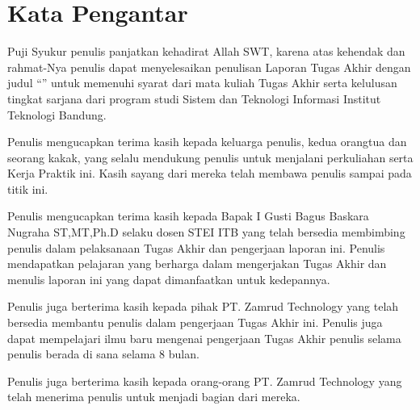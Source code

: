 \chapter*{Kata Pengantar}

Puji Syukur penulis panjatkan kehadirat Allah SWT, karena atas kehendak dan rahmat-Nya penulis dapat menyelesaikan penulisan Laporan Tugas Akhir dengan judul “\thetitle ” untuk memenuhi syarat dari mata kuliah Tugas Akhir serta kelulusan tingkat sarjana dari program studi Sistem dan Teknologi Informasi Institut Teknologi Bandung.

Penulis mengucapkan terima kasih kepada keluarga penulis, kedua orangtua dan seorang kakak, yang selalu mendukung penulis untuk menjalani perkuliahan serta Kerja Praktik ini. Kasih sayang dari mereka telah membawa penulis sampai pada titik ini.

Penulis mengucapkan terima kasih kepada Bapak I Gusti Bagus Baskara Nugraha ST,MT,Ph.D selaku dosen STEI ITB yang telah bersedia membimbing penulis dalam pelaksanaan Tugas Akhir dan pengerjaan laporan ini. Penulis mendapatkan pelajaran yang berharga dalam mengerjakan Tugas Akhir dan menulis laporan ini yang dapat dimanfaatkan untuk kedepannya.

Penulis juga berterima kasih kepada pihak PT. Zamrud Technology yang telah bersedia membantu penulis dalam pengerjaan Tugas Akhir ini. Penulis juga dapat mempelajari ilmu baru mengenai pengerjaan Tugas Akhir penulis selama penulis berada di sana selama 8 bulan.

Penulis juga berterima kasih kepada orang-orang PT. Zamrud Technology yang telah menerima penulis untuk menjadi bagian dari mereka.